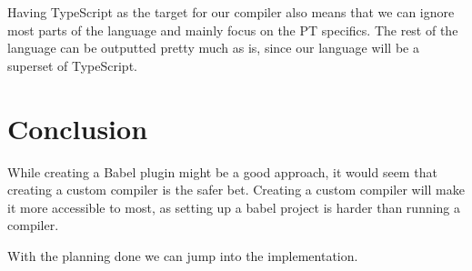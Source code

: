 Having TypeScript as the target for our compiler also means that we can ignore most parts of the language and mainly focus on the PT specifics.
The rest of the language can be outputted pretty much as is, since our language will be a superset of TypeScript.


\section{Conclusion}\label{sec:planning-conclusion}

While creating a Babel plugin might be a good approach, it would seem that creating a custom compiler is the safer bet.
Creating a custom compiler will make it more accessible to most, as setting up a babel project is harder than running a compiler.

With the planning done we can jump into the implementation.